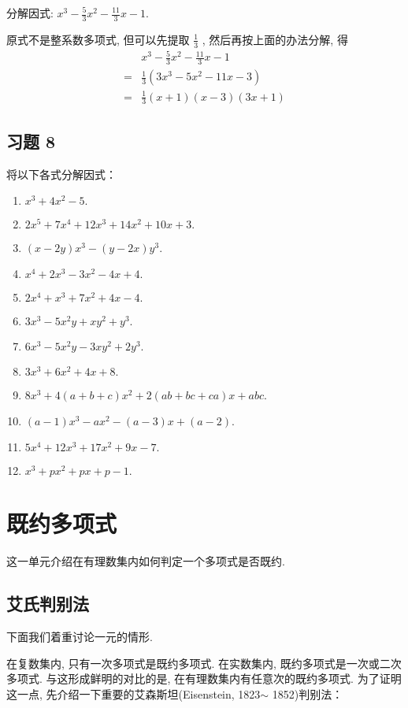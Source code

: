 \begin{example}
	分解因式: $x^{3}-\frac{5}{3} x^{2}-\frac{11}{3} x-1$.
\end{example}
\begin{solution}
	原式不是整系数多项式, 但可以先提取 $\frac{1}{3}$ , 然后再按上面的办法分解, 得
	\begin{align*}
		  & x^{3}-\frac{5}{3} x^{2}-\frac{11}{3} x-1       \\
		= & \frac{1}{3}\left(3 x^{3}-5 x^{2}-11 x-3\right) \\
		= & \frac{1}{3}(x+1)(x-3)(3 x+1)
	\end{align*}
\end{solution}

\subsection*{习题 8}
将以下各式分解因式：
\begin{enumerate}
	\item $x^{3}+4 x^{2}-5.$
	\item $2 x^{5}+7 x^{4}+12 x^{3}+14 x^{2}+10 x+3.$
	\item $(x-2 y) x^{3}-(y-2 x) y^{3}.$
	\item $x^{4}+2 x^{3}-3 x^{2}-4 x+4.$
	\item $2 x^{4}+x^{3}+7 x^{2}+4 x-4.$
	\item $3 x^{3}-5 x^{2} y+x y^{2}+y^{3}.$
	\item $6 x^{3}-5 x^{2} y-3 x y^{2}+2 y^{3}.$
	\item $3 x^{3}+6 x^{2}+4 x+8.$
	\item $8 x^{3}+4(a+b+c) x^{2}+2(a b+b c+c a) x+a b c.$
	\item $(a-1) x^{3}-a x^{2}-(a-3) x+(a-2).$
	\item $5x^{4}+12 x^{3}+17 x^{2}+9 x-7.$
	\item $x^{3}+p x^{2}+p x+p-1.$
\end{enumerate}


\section{既约多项式}
这一单元介绍在有理数集内如何判定一个多项式是否既约.
\subsection{艾氏判别法}
下面我们着重讨论一元的情形.

在复数集内, 只有一次多项式是既约多项式. 在实数集内, 既约多项式是一次或二次多项式. 与这形成鲜明的对比的是, 在有理数集内有任意次的既约多项式. 为了证明这一点, 先介绍一下重要的艾森斯坦(Eisenstein, 1823$\sim$ 1852)判别法：

